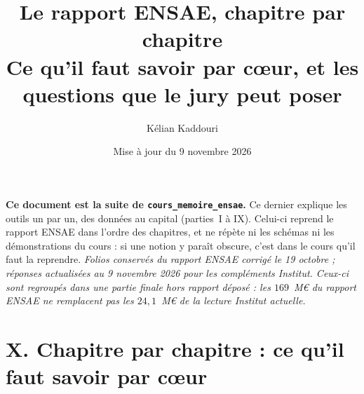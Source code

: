 
\usepackage{longtable}

\title{\vspace{-1.3cm}\color{navy}\bfseries Le rapport ENSAE, chapitre par chapitre\\[3pt]
  \large Ce qu'il faut savoir par c\oe ur, et les questions que le jury peut poser}
\author{Kélian Kaddouri}
\date{Mise à jour du 9 novembre 2026}


\maketitle
\vspace{-0.8cm}

\begin{cle}
\textbf{Ce document est la suite de \texttt{cours\_memoire\_ensae}.} Ce dernier explique les outils
un par un, des données au capital (parties~I à IX). Celui-ci reprend le rapport ENSAE dans l'ordre
des chapitres, et ne répète ni les schémas ni les démonstrations du cours : si une notion y
paraît obscure, c'est dans le cours qu'il faut la reprendre. \emph{Folios conservés du rapport ENSAE corrigé le 19 octobre ; réponses actualisées au
9 novembre 2026 pour les compléments Institut. Ceux-ci sont regroupés dans une partie finale
hors rapport déposé : les $169$~M\euro{} du rapport ENSAE ne remplacent pas les $24{,}1$~M\euro{}
de la lecture Institut actuelle.}
\end{cle}

\tableofcontents
\newpage

\part*{X. Chapitre par chapitre : ce qu'il faut savoir par c\oe ur}

